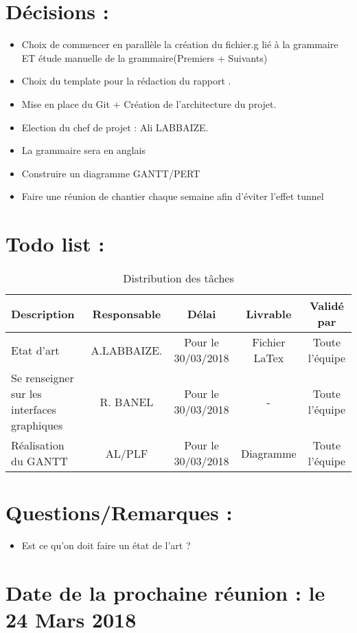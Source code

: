 \documentclass[11pt]{meetingmins}
\begin{document}
    \section{Décisions : }
    \begin{itemize}
        \item
        Choix de commencer en parallèle la création du fichier.g lié à la grammaire ET étude manuelle de la grammaire(Premiers + Suivants)
        \item
        Choix du template pour la rédaction du rapport .
        \item
        Mise en place du Git + Création de l'architecture du projet.
        \item
        Election du chef de projet : Ali LABBAIZE.
        \item La grammaire sera en anglais
        \item Construire un diagramme GANTT/PERT
        \item Faire une réunion de chantier chaque semaine afin d'éviter l'effet tunnel
        \end{itemize}

    \section{Todo list :}
    \begin{table}[h]
        \centering
        \begin{tabular}{|p{4cm}|c|c|c|c|}
            \hline
            \rowcolor{yellow} Description & Responsable & Délai & Livrable & Validé par
            \tabularnewline \hline
            Etat d'art & A.LABBAIZE. & Pour le 30/03/2018 & Fichier LaTex & Toute l'équipe
            \tabularnewline \hline
            Se renseigner sur les interfaces graphiques & R. BANEL & Pour le 30/03/2018 & - & Toute l'équipe
            \tabularnewline \hline
            Réalisation du GANTT  & AL/PLF & Pour le 30/03/2018 & Diagramme & Toute l'équipe 
            \tabularnewline
            \hline  
        \end{tabular}
        \caption{Distribution des tâches}
        \label{tab:my_label}
    \end{table}
    
    \section{Questions/Remarques :}
    \begin{itemize}
        \item Est ce qu'on doit faire un état de l'art ?
    \end{itemize}
    \section{Date de la prochaine réunion : \textnormal{le 24 Mars 2018} }
    
    
    
    
\end{document}
